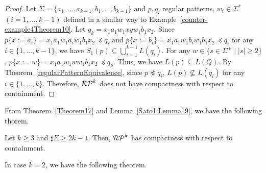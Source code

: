 
\begin{proof}
    Let $\Sigma =\{a_{1},\ldots,a_{k-1},b_{1},\ldots,b_{k-1}\}$ and
    $p, q_{i}$ regular patterns, $w_{i} \in \Sigma^{\ast}$\ $(i=1,\ldots,k-1)$
    defined in a similar way to Example~\ref{counter-example4Theorem10}. %
    Let $q_{k}=x_{1}a_{1}w_{1}xyw_{1}b_{1}x_{2}$.
    Since
    $p\{x:=a_{i}\} = x_{1}a_{1}w_{1}a_{i}w_{1}b_{1}x_{2} \preceq q_{i}$ and
    $p\{x:=b_{i}\} = x_{1}a_{1}w_{1}b_{i}w_{1}b_{1}x_{2} \preceq q_{i}$
    for any $i \in \{1,\ldots,k-1\}$,
    we have $S_{1}(p) \subseteq \bigcup_{i=1}^{k-1}L(q_{i})$.
    For any $w \in \{s \in \Sigma^{+} \mid |s| \geq 2\}$,
    $p\{x:=w\}=x_{1}a_{1}w_{1}ww_{1}b_{1}x_{2} \preceq q_{k}$.
    Thus, we have $L(p) \subseteq L(Q)$.
    By Theorem~\ref{regularPatternEquivalence},
    since $p \not \preceq q_{i}$, $L(p) \not \subseteq L(q_{i})$
    for any $i \in \{1,\ldots, k\}$.
    Therefore, $\mathcal{RP}^{k}$ does not have compactness with respect to containment.
\end{proof}

From Theorem~\ref{Theorem17}%
 and Lemma~\ref{Sato1:Lemma19}, %
we have the following thorem.


\begin{thm}
    Let $k \geq 3$ and $\sharp\Sigma \geq 2k-1$.
    Then, $\mathcal{RP}^{k}$ has compactness with respect to containment.
\end{thm}

In case $k=2$, we have the following theorem.



